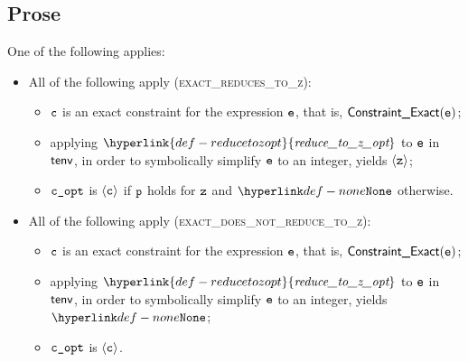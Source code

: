 \documentclass{book}
\newcommand\reducetozopt[0]{\hyperlink{def-reducetozopt}{\textfunc{reduce\_to\_z\_opt}}}
\begin{document}
\subsection{Prose}
One of the following applies:
\begin{itemize}
  \item All of the following apply (\textsc{exact\_reduces\_to\_z}):
  \begin{itemize}
    \item $\texttt{c}$ is an exact constraint for the expression $\texttt{e}$, that is, $\textsf{Constraint\_Exact}(\texttt{e})$;
    \item applying $\reducetozopt$ to $\texttt{e}$ in $\textsf{tenv}$, in order to symbolically simplify $\texttt{e}$ to an integer,
          yields $\langle\texttt{z}\rangle$;
    \item $\texttt{c\_opt}$ is $\langle\texttt{c}\rangle$ if $\texttt{p}$ holds for $\texttt{z}$ and $\None$ otherwise.
  \end{itemize}

  \item All of the following apply (\textsc{exact\_does\_not\_reduce\_to\_z}):
  \begin{itemize}
    \item $\texttt{c}$ is an exact constraint for the expression $\texttt{e}$, that is, $\textsf{Constraint\_Exact}(\texttt{e})$;
    \item applying $\reducetozopt$ to $\texttt{e}$ in $\textsf{tenv}$, in order to symbolically simplify $\texttt{e}$ to an integer,
          yields $\None$;
    \item $\texttt{c\_opt}$ is $\langle\texttt{c}\rangle$.
  \end{itemize}


\end{itemize}
\end{document}
